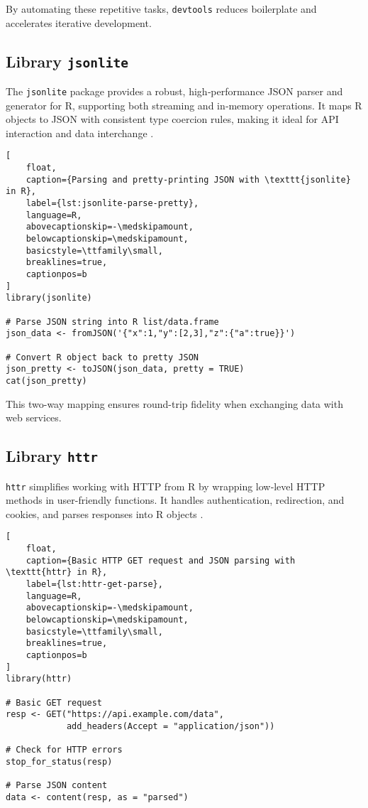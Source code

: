 By automating these repetitive tasks, \texttt{devtools} reduces boilerplate and accelerates iterative development.

\subsection{Library \texttt{jsonlite}}

The \texttt{jsonlite} package provides a robust, high‐performance JSON parser and generator for R, supporting both streaming and in‐memory operations. It maps R objects to JSON with consistent type coercion rules, making it ideal for API interaction and data interchange \cite{ooms2014jsonlite}.

\begin{lstlisting}[
    float,
    caption={Parsing and pretty-printing JSON with \texttt{jsonlite} in R},
    label={lst:jsonlite-parse-pretty},
    language=R,
    abovecaptionskip=-\medskipamount,
    belowcaptionskip=\medskipamount,
    basicstyle=\ttfamily\small,
    breaklines=true,
    captionpos=b
]
library(jsonlite)

# Parse JSON string into R list/data.frame
json_data <- fromJSON('{"x":1,"y":[2,3],"z":{"a":true}}')

# Convert R object back to pretty JSON
json_pretty <- toJSON(json_data, pretty = TRUE)
cat(json_pretty)
\end{lstlisting}


This two-way mapping ensures round-trip fidelity when exchanging data with web services.

\subsection{Library \texttt{httr}}

\texttt{httr} simplifies working with HTTP from R by wrapping low‐level HTTP methods in user-friendly functions. It handles authentication, redirection, and cookies, and parses responses into R objects \cite{wickham2011httr}.

\begin{lstlisting}[
    float,
    caption={Basic HTTP GET request and JSON parsing with \texttt{httr} in R},
    label={lst:httr-get-parse},
    language=R,
    abovecaptionskip=-\medskipamount,
    belowcaptionskip=\medskipamount,
    basicstyle=\ttfamily\small,
    breaklines=true,
    captionpos=b
]
library(httr)

# Basic GET request
resp <- GET("https://api.example.com/data",
            add_headers(Accept = "application/json"))

# Check for HTTP errors
stop_for_status(resp)

# Parse JSON content
data <- content(resp, as = "parsed")
\end{lstlisting}


